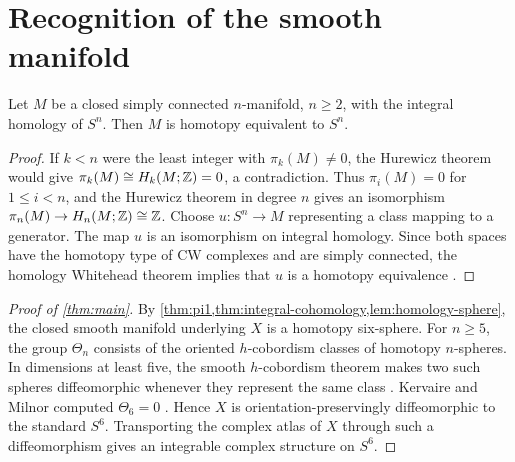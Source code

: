\section{Recognition of the smooth manifold}

\begin{lemma}\label{lem:homology-sphere}
Let $M$ be a closed simply connected $n$-manifold, $n\ge2$, with the
integral homology of $S^n$.  Then $M$ is homotopy equivalent to $S^n$.
\end{lemma}

\begin{proof}
If $k<n$ were the least integer with $\pi_k(M)\ne0$, the Hurewicz
theorem would give $\pi_k(M)\cong H_k(M;\mathbb Z)=0$, a contradiction.
Thus $\pi_i(M)=0$ for $1\le i<n$, and the Hurewicz theorem in degree
$n$ gives an isomorphism $\pi_n(M)\to H_n(M;\mathbb Z)\cong\mathbb Z$.  Choose
$u:S^n\to M$ representing a class mapping to a generator.  The map $u$
is an isomorphism on integral homology.  Since both spaces have the
homotopy type of CW complexes and are simply connected, the homology
Whitehead theorem implies that $u$ is a homotopy equivalence
\cite[Ch.~4]{Hatcher}.
\end{proof}

\begin{proof}[Proof of \cref{thm:main}]
By \cref{thm:pi1,thm:integral-cohomology,lem:homology-sphere}, the closed
smooth manifold underlying $X$ is a homotopy six-sphere.  For $n\ge5$, the group $\Theta_n$ consists of the oriented
$h$-cobordism classes of homotopy $n$-spheres.  In dimensions at least five, the smooth
$h$-cobordism theorem makes two such spheres diffeomorphic whenever they
represent the same class \cite{Milnor}.  Kervaire and Milnor computed
$\Theta_6=0$ \cite{KM}.  Hence $X$ is
orientation-preservingly diffeomorphic to the standard $S^6$.  Transporting
the complex atlas of $X$ through such a diffeomorphism gives an integrable
complex structure on $S^6$.
\end{proof}


